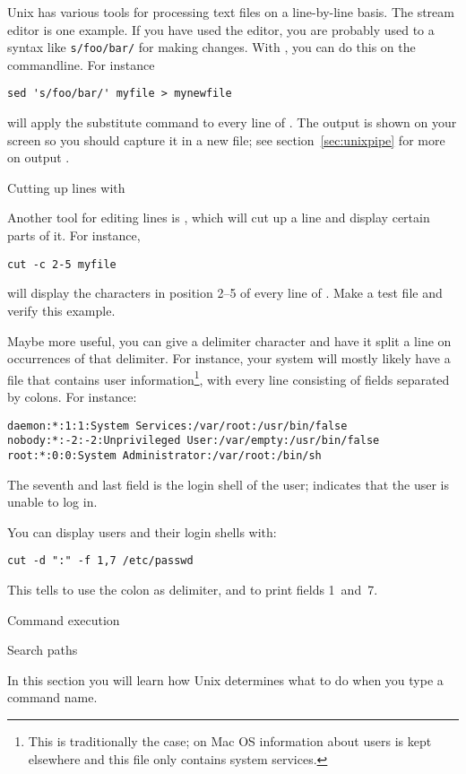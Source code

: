 Unix has various tools for processing text files on a line-by-line
basis. The stream editor  is one example. If you have used the
 editor, you are probably used to a syntax like
\verb+s/foo/bar/+ for making changes. With , you can do this on
the commandline. For instance
\begin{verbatim}
sed 's/foo/bar/' myfile > mynewfile
\end{verbatim}
will apply the substitute command  to every line of
. The output is shown on your screen so you should capture
it in a new file; see section~\ref{sec:unixpipe} for more on output
.

 {Cutting up lines with \protect{}}

Another tool for editing lines is , which will cut up a line
and display certain parts of it. For instance,
\begin{verbatim}
cut -c 2-5 myfile
\end{verbatim}
will display the characters in position 2--5 of every line of
. Make a test file and verify this example.

Maybe more useful, you can give  a delimiter character and have
it split a line on occurrences of that delimiter. For instance, your system
will mostly likely have a file  that contains user
information\footnote{This is traditionally the case; on Mac OS
  information about users is kept elsewhere and this file only
  contains system services.}, with every line consisting of fields
separated by colons. For instance:
\begin{verbatim}
daemon:*:1:1:System Services:/var/root:/usr/bin/false
nobody:*:-2:-2:Unprivileged User:/var/empty:/usr/bin/false
root:*:0:0:System Administrator:/var/root:/bin/sh
\end{verbatim}
The seventh and last field is the login shell of the user;
 indicates that the user is unable to log in.

You can display users and their login shells with:
\begin{verbatim}
cut -d ":" -f 1,7 /etc/passwd
\end{verbatim}
This tells  to use the colon as delimiter, and to print fields
1~and~7.

 {Command execution}

 {Search paths}
\begin{purpose}
  In this section you will learn how Unix determines what to do when
  you type a command name.
\end{purpose}

